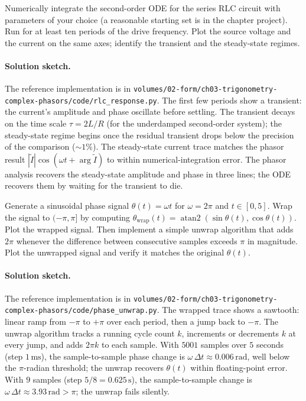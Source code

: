 \begin{exercise}
Numerically integrate the second-order ODE for the series RLC
circuit with parameters of your choice (a reasonable starting
set is in the chapter project). Run for at least ten periods of
the drive frequency. Plot the source voltage and the current on
the same axes; identify the transient and the steady-state regimes.

\paragraph{Solution sketch.}
The reference implementation is in
\verb|volumes/02-form/ch03-trigonometry-complex-phasors/code/rlc_response.py|.
The first few periods show a transient: the current's amplitude
and phase oscillate before settling. The transient decays on the
time scale $\tau = 2L/R$ (for the underdamped second-order system);
the steady-state regime begins once the residual transient drops
below the precision of the comparison ($\sim 1\%$). The
steady-state current trace matches the phasor result $|\tilde I|
\cos(\omega t + \arg \tilde I)$ to within numerical-integration
error. The phasor analysis recovers the steady-state amplitude
and phase in three lines; the ODE recovers them by waiting for
the transient to die.
\end{exercise}

\begin{exercise}
Generate a sinusoidal phase signal $\theta(t) = \omega t$ for
$\omega = 2\pi$ and $t \in [0, 5]$. Wrap the signal to
$(-\pi, \pi]$ by computing $\theta_{\text{wrap}}(t) =
\operatorname{atan2}(\sin\theta(t), \cos\theta(t))$. Plot the
wrapped signal. Then
implement a simple unwrap algorithm that adds $2\pi$ whenever
the difference between consecutive samples exceeds $\pi$ in
magnitude. Plot the unwrapped signal and verify it matches the
original $\theta(t)$.

\paragraph{Solution sketch.}
The reference implementation is in
\verb|volumes/02-form/ch03-trigonometry-complex-phasors/code/phase_unwrap.py|.
The wrapped trace shows a sawtooth: linear ramp from $-\pi$ to
$+\pi$ over each period, then a jump back to $-\pi$. The unwrap
algorithm tracks a running cycle count $k$, increments or
decrements $k$ at every jump, and adds $2\pi k$ to each sample.
With $5001$ samples over $5$ seconds (step $1\,\si{\milli\second}$),
the sample-to-sample phase change is $\omega\,\Delta t \approx
0.006\,\text{rad}$, well below the $\pi$-radian threshold; the
unwrap recovers $\theta(t)$ within floating-point error. With
$9$ samples (step $5/8 = 0.625\,\si{\second}$), the
sample-to-sample change is $\omega\,\Delta t \approx 3.93\,\text{rad}
> \pi$; the unwrap fails silently.
\end{exercise}

